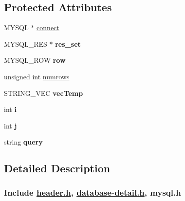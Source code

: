 \subsection*{Protected Attributes}
\begin{DoxyCompactItemize}
\item 
M\-Y\-S\-Q\-L $\ast$ \hyperlink{classDatabase_aa232b806b05ef654cd5579bca5f1dbad}{connect}
\item 
\hypertarget{classDatabase_ad5921cd2f70d0c22895f2cc5542ab4d7}{M\-Y\-S\-Q\-L\-\_\-\-R\-E\-S $\ast$ {\bfseries res\-\_\-set}}\label{classDatabase_ad5921cd2f70d0c22895f2cc5542ab4d7}

\item 
\hypertarget{classDatabase_a71ad7ae59677936d2ca6666f9de9df40}{M\-Y\-S\-Q\-L\-\_\-\-R\-O\-W {\bfseries row}}\label{classDatabase_a71ad7ae59677936d2ca6666f9de9df40}

\item 
unsigned int \hyperlink{classDatabase_a02965883689dd1d8007c86cebf6df89e}{numrows}
\item 
\hypertarget{classDatabase_a88f3a0df87e5e40207100d5b1f7ee6b1}{S\-T\-R\-I\-N\-G\-\_\-\-V\-E\-C {\bfseries vec\-Temp}}\label{classDatabase_a88f3a0df87e5e40207100d5b1f7ee6b1}

\item 
\hypertarget{classDatabase_a1b3174ab4ae9b3cb80448d48817375be}{int {\bfseries i}}\label{classDatabase_a1b3174ab4ae9b3cb80448d48817375be}

\item 
\hypertarget{classDatabase_a5b4fd605238ca66878959f5f3ba647f2}{int {\bfseries j}}\label{classDatabase_a5b4fd605238ca66878959f5f3ba647f2}

\item 
\hypertarget{classDatabase_a851daa5b233ce54d75873631b7b2167a}{string {\bfseries query}}\label{classDatabase_a851daa5b233ce54d75873631b7b2167a}

\end{DoxyCompactItemize}


\subsection{Detailed Description}


 \subsubsection*{Include \hyperlink{header_8h_source}{header.\-h}, \hyperlink{database-detail_8h_source}{database-\/detail.\-h}, mysql.\-h}



